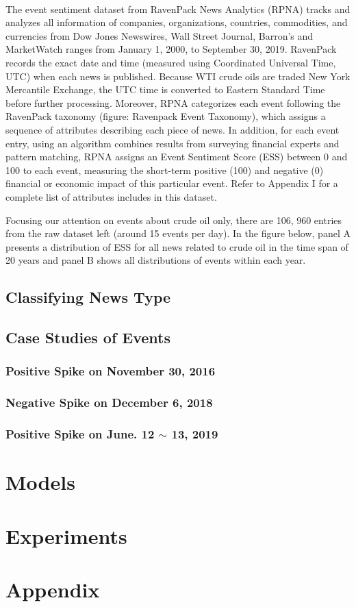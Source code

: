 \documentclass[12pt]{article}
\begin{document}
	\paragraph{} The event sentiment dataset from RavenPack News Analytics (RPNA) tracks and analyzes all information of companies, organizations, countries, commodities, and currencies from Dow Jones Newswires, Wall Street Journal, Barron’s and MarketWatch ranges from January 1, 2000, to September 30, 2019. RavenPack records the exact date and time (measured using Coordinated Universal Time, UTC)  when each news is published. Because WTI crude oils are traded New York Mercantile Exchange, the UTC time is converted to Eastern Standard Time before further processing. Moreover, RPNA categorizes each event following the RavenPack taxonomy (figure: Ravenpack Event Taxonomy), which assigns a sequence of attributes describing each piece of news. In addition, for each event entry, using an algorithm combines results from surveying financial experts and pattern matching, RPNA assigns an Event Sentiment Score (ESS) between 0 and 100 to each event, measuring the short-term positive (100) and negative (0) financial or economic impact of this particular event. Refer to Appendix I for a complete list of attributes includes in this dataset.

	\par Focusing our attention on events about crude oil only, there are 106, 960 entries from the raw dataset left (around 15 events per day). In the figure below, panel A presents a distribution of ESS for all news related to crude oil in the time span of 20 years and panel B shows all distributions of events within each year.


	\subsection{Classifying News Type}
	
	\subsection{Case Studies of Events}
	\subsubsection{Positive Spike on November 30, 2016}
	
	\subsubsection{Negative Spike on December 6, 2018}
	
	\subsubsection{Positive Spike on June. 12 $\sim$ 13, 2019}
	\section{Models}
	
	\section{Experiments}

	
	
	

	\section{Appendix}
\end{document}

